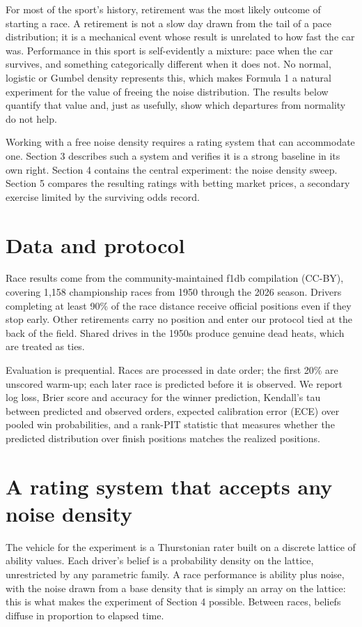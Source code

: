 \documentclass[11pt]{article}
\begin{document}
\noindent For most of the sport's history, retirement was the most likely
outcome of starting a race. A retirement is not a slow day drawn from the
tail of a pace distribution; it is a mechanical event whose result is
unrelated to how fast the car was. Performance in this sport is
self-evidently a mixture: pace when the car survives, and something
categorically different when it does not. No normal, logistic or Gumbel
density represents this, which makes Formula 1 a natural experiment for
the value of freeing the noise distribution. The results below quantify
that value and, just as usefully, show which departures from normality do
not help.

Working with a free noise density requires a rating system that can
accommodate one. Section 3 describes such a system and verifies it is a
strong baseline in its own right. Section 4 contains the central
experiment: the noise density sweep. Section 5 compares the resulting
ratings with betting market prices, a secondary exercise limited by the
surviving odds record.

\section{Data and protocol}

Race results come from the community-maintained f1db compilation (CC-BY),
covering 1{,}158 championship races from 1950 through the 2026 season.
Drivers completing at least 90\% of the race distance receive official
positions even if they stop early. Other retirements carry no position and
enter our protocol tied at the back of the field. Shared drives in the
1950s produce genuine dead heats, which are treated as ties.

Evaluation is prequential. Races are processed in date order; the first
20\% are unscored warm-up; each later race is predicted before it is
observed. We report log loss, Brier score and accuracy for the winner
prediction, Kendall's tau between predicted and observed orders, expected
calibration error (ECE) over pooled win probabilities, and a rank-PIT
statistic that measures whether the predicted distribution over finish
positions matches the realized positions.

\section{A rating system that accepts any noise density}

The vehicle for the experiment is a Thurstonian rater built on a discrete
lattice of ability values. Each driver's belief is a probability density
on the lattice, unrestricted by any parametric family. A race performance
is ability plus noise, with the noise drawn from a base density that is
simply an array on the lattice: this is what makes the experiment of
Section 4 possible. Between races, beliefs diffuse in proportion to
elapsed time.
\end{document}
